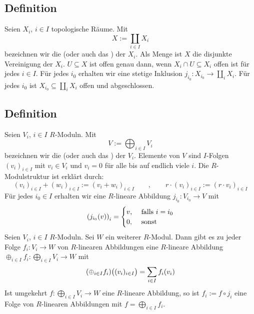 \subsection[Definition: Summe oder Koprodukt von topologischen Räumen]{Definition} %
\label{sub:68}
Seien $X_i$, $i \in I$ topologische Räume. Mit 
\[
	X := \coprod_{i \in I} X_i 
\]
bezeichnen wir die  (oder auch das ) der $X_i$. Als Menge
ist $X$ die disjunkte Vereinigung der $X_i$. $U \subseteq X$ ist offen genau dann, wenn $X_i \cap U \subseteq X_i$ offen ist für jedes $i \in I$. Für jedes $i_0$ erhalten
wir eine stetige Inklusion $j_{i_0} \colon X_{i_0} \to \coprod_{i} X_i$.
Für jedes $i_0$ ist $X_{i_0} \subseteq \coprod_i X_i$ offen und abgeschlossen.

\subsection[Definition: Summe von $R$-Moduln]{Definition} %
\label{sub:69}
Seien $V_i$, $i \in I$ $R$-Moduln. Mit 
\[
	V := \bigoplus_{i \in I} V_i
\]
bezeichnen wir die  (oder auch das ) der $V_i$. Elemente von $V$ sind $I$-Folgen $(v_i)_{i \in I}$ mit $v_i \in V_i$ und $v_i=0$ für
alle bis auf endlich viele $i$. Die $R$-Modulstruktur ist erklärt durch:
\[
	(v_i)_{i \in I} + (w_i)_{i \in I} := (v_i +w_i)_{i \in I} \qquad ,\qquad r \cdot (v_i)_{i \in I} := (r \cdot v_i)_{i \in I}
\]
Für jedes $i_0 \in I$ erhalten wir eine $R$-lineare Abbildung $j_{i_0} \colon V_{i_0} \to V$ mit
\[
	\enbrace*{j_{i_0} (v)}_{i} = \begin{cases}
		v, &\text{ falls }i=i_0\\
		0 ,&\text{ sonst}
	\end{cases} 
\]
Seien $V_i$, $i \in I$ $R$-Moduln. Sei $W$ ein weiterer $R$-Modul. Dann gibt es zu jeder Folge $f_i \colon V_i \to W$ von $R$-linearen Abbildungen eine
$R$-lineare Abbildung 
\(
	\oplus_{i \in I} f_i \colon \bigoplus_{i \in I} V_i \to W  
\)
mit
\[
	\enbrace*{\oplus_{i \in I} f_i} \enbrace[\big]{(v_i)_{i \in I}} = \sum_{i \in I} f_i(v_i)  
\]
Ist umgekehrt $f \colon \bigoplus_{i \in I} V_i \to W$ eine $R$-lineare Abbildung, so ist $f_i := f \circ j_{i}$ eine Folge von $R$-linearen Abbildungen mit 
$f = \bigoplus_{i \in I} f_i$.

